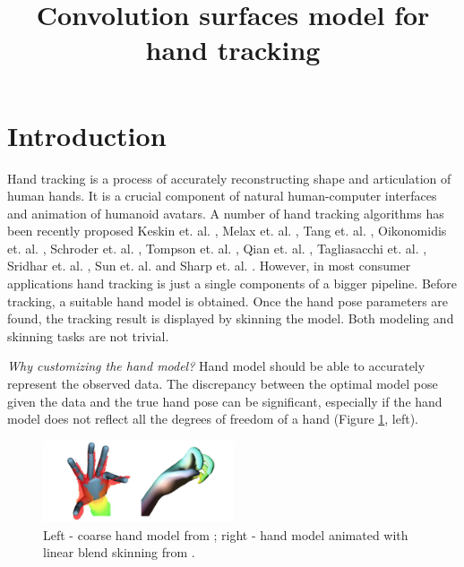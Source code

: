\documentclass[10pt,journal,a4paper]{IEEEtran}
\title{Convolution surfaces model  for hand tracking}
\begin{document}
\maketitle

\section{Introduction}

Hand tracking is a process of accurately reconstructing shape and articulation of human hands. It is a crucial component of natural human-computer interfaces and animation of humanoid avatars. A number of hand tracking algorithms has been recently proposed  Keskin et. al. \cite{keskin2012hand}, Melax et. al. \cite{melax2013dynamics}, Tang et. al. \cite{tang2013real}, Oikonomidis et. al. \cite{oikonomidis2014evolutionary}, Schroder et. al. \cite{schroder2014real},
Tompson et. al. \cite{tompson2014real}, Qian et. al. \cite{qian2014realtime},  Tagliasacchi et. al. \cite{tagliasacchi2015robust}, Sridhar et. al. \cite{sridhar2015fast}, Sun et. al. \cite{sun2015cascaded} and Sharp et. al. \cite{sharp2015accurate}.
However, in most consumer applications hand tracking is just a single components of a bigger pipeline. Before tracking, a suitable hand model is obtained. Once the hand pose parameters are found, the tracking result is displayed by skinning the model. Both modeling and skinning tasks are not trivial.

\textit{Why customizing the hand model?}
Hand model should be able to accurately represent the observed data.  The discrepancy between the optimal model pose given the data and the true hand pose can be significant, especially if the hand model does not reflect all the degrees of freedom of a hand (Figure \ref{fig:coarse_hand_model_and_lbs}, left).


\begin{figure}[h!] 
	\centering
	\hspace{-2em}
	\includegraphics[width=0.5\textwidth]{figures/coarse_hand_model_and_lbs}
	\caption{Left - coarse hand model  from \cite{tagliasacchi2015robust}; right - hand model animated with linear blend skinning from \cite{sharp2015accurate}.}
	\label{fig:coarse_hand_model_and_lbs}
\end{figure}
\end{document}
